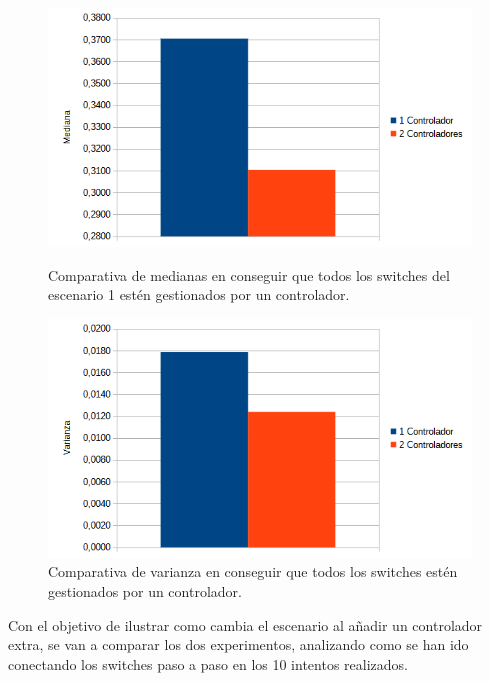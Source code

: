 \documentclass[a4paper, 12pt]{book}
\begin{document}
 	 
 	 \begin{figure}[H]
 	 	\centering
 	 	\begin{minipage}[b]{0.45\textwidth}
 	 		\centering
 	 		\includegraphics[width=\textwidth]{img/comparativamedianabucle.png}
 	 		\caption{Comparativa de medianas en conseguir que todos los switches del escenario 1 estén gestionados por un controlador.}
 	 		\label{fig:mediana}
 	 	\end{minipage}
 	 	\hfill
 	 	\begin{minipage}[b]{0.45\textwidth}
 	 		\centering
 	 		\includegraphics[width=\textwidth]{img/comparativavarianzabucle.png}
 	 		\caption{Comparativa de varianza en conseguir que todos los switches estén gestionados por un controlador.}
 	 		\label{fig:varianza}
 	 	\end{minipage}
 	 \end{figure}
 	 	
 
 	
 	Con el objetivo de ilustrar como cambia el escenario al añadir un controlador extra, se van a comparar los dos experimentos, analizando como se han ido conectando los switches paso a paso en los 10 intentos realizados.
 	
\end{document}

